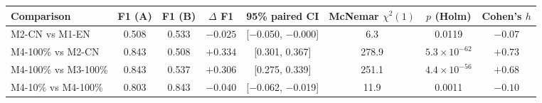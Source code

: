 \begin{tabular}{@{}lccccccc@{}}
\toprule
Comparison & F1 (A) & F1 (B) & $\Delta$ F1 & 95\% paired CI & McNemar $\chi^2(1)$ & $p$ (Holm) & Cohen's $h$ \\
\midrule
M2-CN vs M1-EN & 0.508 & 0.533 & $-0.025$ & [$-$0.050, $-$0.000] & 6.3 & 0.0119 & $-0.07$ \\
M4-100\% vs M2-CN & 0.843 & 0.508 & $+0.334$ & [0.301, 0.367] & 278.9 & $5.3\times10^{-62}$ & $+0.73$ \\
M4-100\% vs M3-100\% & 0.843 & 0.537 & $+0.306$ & [0.275, 0.339] & 251.1 & $4.4\times10^{-56}$ & $+0.68$ \\
M4-10\% vs M4-100\% & 0.803 & 0.843 & $-0.040$ & [$-$0.062, $-$0.019] & 11.9 & 0.0011 & $-0.10$ \\
\bottomrule
\end{tabular}